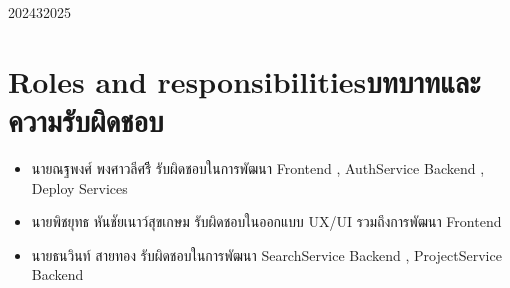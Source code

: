 \begin{plan}{10}{2024}{3}{2025}
\end{plan}


\section{\ifenglish Roles and responsibilities\else บทบาทและความรับผิดชอบ\fi}
\begin{itemize}
  \item นายณฐพงศ์ พงศาวลีศรีี รับผิดชอบในการพัฒนา Frontend , AuthService Backend , Deploy Services 
  \item นายพิชยุทธ หันชัยเนาว์สุขเกษม รับผิดชอบในออกแบบ UX/UI รวมถึงการพัฒนา Frontend 
  \item นายธนวินท์ สายทอง รับผิดชอบในการพัฒนา SearchService Backend , ProjectService Backend
  
\end{itemize}



